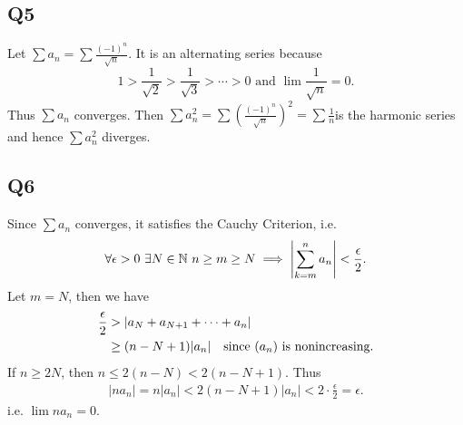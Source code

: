 \documentclass[12pt,lettersize]{article}
\newcommand{\N}{\mathbb{N}}
\begin{document}
	\subsection*{Q5}
	Let $\sum a_n=\sum\frac{(-1)^n}{\sqrt{n}}$. It is an alternating series because 
	\begin{displaymath}
		1>\frac{1}{\sqrt{2}}>\frac{1}{\sqrt{3}}>\cdots>0\text{ and }\lim\frac{1}{\sqrt{n}}=0.
	\end{displaymath}
	Thus $\sum a_n$ converges. Then $\sum a_n^2=\sum(\frac{(-1)^n}{\sqrt{n}})^2=\sum \frac{1}{n}$is the harmonic series and hence $\sum a_n^2$ diverges.
	\newpage
	
	\subsection*{Q6}
	Since $\sum a_n$ converges, it satisfies the Cauchy Criterion, i.e.
	\begin{displaymath}
		\forall\epsilon>0\ \exists N\in\N\ n\geq m\geq N\implies \abs{\sum_{k=m}^{n}a_n}<\frac{\epsilon}{2}.
	\end{displaymath}
	Let $m=N$, then we have 
	\begin{align*}
		\frac{\epsilon}{2} &> \abs{a_N+a_{N+1}+\cdots+a_n}\\
				 &\geq (n-N+1)\abs{a_n}\quad\text{since $(a_n)$ is nonincreasing.}
	\end{align*}
	If $n\geq 2N$, then $n\leq 2(n-N)<2(n-N+1)$. Thus
	\begin{align*}
		|na_n|=n|a_n|<2(n-N+1)|a_n|<2\cdot\frac{\epsilon}{2}=\epsilon.
	\end{align*}
	i.e. $\lim na_n=0$.
	\newpage
	
\end{document}
